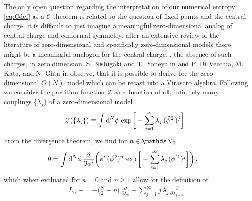 The only open question regarding the interpretation of our numerical entropy \eqref{eq:Cdef} as a $\mathcal{C}$-theorem is related to the question of fixed points and the central charge.
\Apriori{} it is difficult to just imagine a meaningful zero-dimensional analog of central charge and conformal symmetry.
\Aposteriori{} \dash{} after an extensive review of the literature of zero-dimensional \qfts{} and specifically zero-dimensional \ON{} models \dash{} there might be a meaningful analogon for the central charge, \ie{}, the absence of such charges, in zero dimension.
S. Nishigaki and T. Yoneya in   and P. Di Vecchia, M. Kato, and N. Ohta in  observe, that it is possible to derive \dses{} for the zero-dimensional $O(N)$ model which can be recast into a Virasoro algebra.
Following  we consider the partition function $\mathcal{Z}$ as a function of all, infinitely many couplings $\{\lambda_j\}$ of a zero-dimensional \ON{} model
\begin{align}
	\mathcal{Z} ( \{\lambda_j\} ) \equiv \int \dif^{\,N}\! \phi \, \exp \bigg[ - \sum_{j = 1}^{\infty} \lambda_j \, ( \vec{\phi}^{\, 2} \, )^j \bigg]\,.\label{eq:zerodO1Zdse}
\end{align}
From the divergence theorem, we find for $n \in \Integers{}_0$
\begin{align}
	0 = \, & \int \dif^{\,N}\! \phi \, \frac{\partial}{\partial \phi^i} \bigg( \phi^i \, ( \vec{\phi}^{\, 2} )^n \, \exp \bigg[ - \sum_{j = 1}^{\infty} \lambda_j \, ( \vec{\phi}^{\, 2} \, )^j \bigg] \bigg)\, ,
\end{align}
which when evaluated for $n=0$ and $n \geq 1$ allow for the definition of 
\begin{align}
	L_n \equiv \, & - \big( \tfrac{N}{2} + n \big) \, \frac{\partial}{\partial \lambda_n} + \sum_{j = 1}^{\infty} j \, \lambda_j \, \frac{\partial}{\partial \lambda_{j + n}} \label{eq:zerodO1L}
\end{align}
